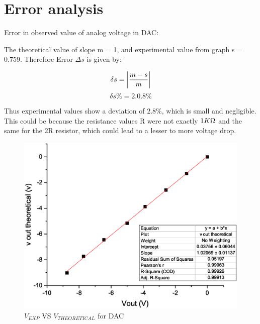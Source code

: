 \section{Error analysis}
	Error in observed value of analog voltage in DAC:

	The theoretical value of slope m = 1, and
	experimental value from graph s = 0.759. Therefore
	Error $\Delta s$ is given by:

	$$\delta s = \abs{\frac{m-s}{m}} $$
	$$\delta s\% = 2.0.8\%$$

	Thus experimental values show a deviation of $2.8\%$, which is small and negligible. This could be because the resistance values R were not exactly $1K\ohm$ and the same for the 2R resistor, which could lead to a lesser to more voltage drop.
	\begin{figure}[H]
		\centering
		\label{graph:1}
		\includegraphics[width=0.8\columnwidth]{images/GR1.eps}
		\caption{$V_{EXP}$ VS $V_{THEORETICAL}$  for DAC }
	\end{figure}
